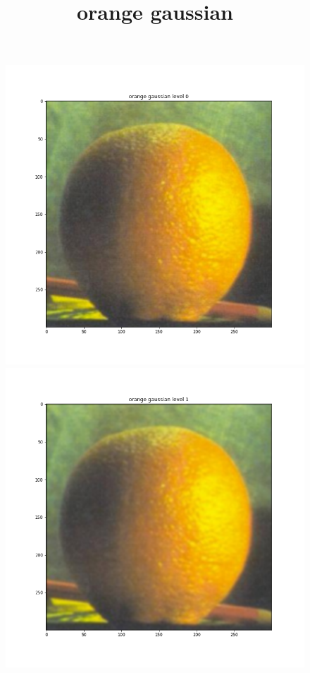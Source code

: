 \documentclass{article}
\begin{document}
\begin{figure}[!htb]
\title{orange gaussian}
    \includegraphics[width=\linewidth]{orange gaussian level 0.png}
\endminipage
{}
    \includegraphics[width=\linewidth]{orange gaussian level 1.png}

\end{figure}
\end{document}
